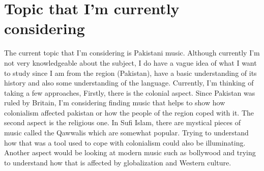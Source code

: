 \documentclass{article}
\begin{document}
  \section{Topic that I'm currently considering}

  The current topic that I'm considering is Pakistani music. Although currently
  I'm not very knowledgeable about the subject, I do have a vague idea of what I
  want to study since I am from the region (Pakistan), have a basic
  understanding of its history and also some understanding of the language.
  Currently, I'm thinking of taking a few approaches, Firstly, there is the
  colonial aspect. Since Pakistan was ruled by Britain, I'm considering finding
  music that helps to show how colonialism affected pakistan or how the people
  of the region coped with it. The second aspect is the religious one. In Sufi
  Islam, there are mystical pieces of music called the Qawwalis which are
  somewhat popular. Trying to understand how that was a tool used to cope with
  colonialism could also be illuminating. Another aspect would be looking at modern
  music such as bollywood and trying to understand how that is affected by globalization
  and Western culture.

  \nocite{*}
  \printbibliography
\end{document}
